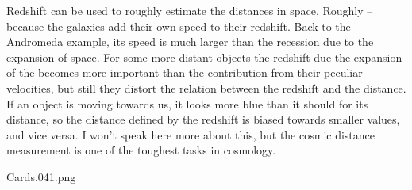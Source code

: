 {Redshift can be used to roughly estimate the distances in space. Roughly -- because the galaxies add their own speed to their redshift. Back to the Andromeda example, its speed is much larger than the recession due to the expansion of space. For some more distant objects the redshift due the expansion of the becomes more important than the contribution from their peculiar velocities, but still they distort the relation between the redshift and the distance. If an object is moving towards us, it looks more blue than it should for its distance, so the distance defined by the redshift is biased towards smaller values, and vice versa. I won't speak here more about this, but the cosmic distance measurement is one of the toughest tasks in cosmology.


}{{Cards.041}.png}


